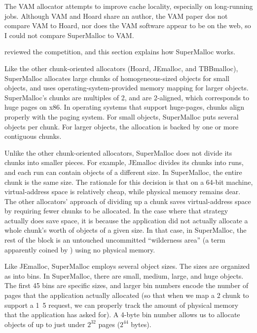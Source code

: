 \documentclass{sigplanconf}
\begin{document}
The VAM allocator \cite{FengBe05} attempts to improve cache locality,
especially on long-running jobs.  Although VAM and Hoard share an
author, the VAM paper dos not compare VAM to Hoard, nor does the VAM
software appear to be on the web, so I could not compare SuperMalloc
to VAM\@.


 reviewed the competition, and this section explains how
SuperMalloc works.   

Like the other chunk-oriented allocators (Hoard, JEmalloc, and
TBBmalloc), SuperMalloc allocates large chunks of homogeneous-sized
objects for small objects, and uses operating-system-provided memory
mapping for larger objects.  SuperMalloc's chunks are multiples of
\unit{2}\mebi\byte, and are \unit{2}\mebi\byte{}-aligned, which
corresponds to huge pages on x86.  In operating systems that support
huge-pages, chunks align properly with the paging system.  For small
objects, SuperMalloc puts several objects per chunk.  For larger
objects, the allocation is backed by one or more contiguous chunks.

Unlike the other chunk-oriented allocators, SuperMalloc does not
divide its chunks into smaller pieces.  For example, JEmalloc divides
its chunks into runs, and each run can contain objects of a different
size.  In SuperMalloc, the entire chunk is the same size.  The
rationale for this decision is that on a 64-bit machine,
virtual-address space is relatively cheap, while physical memory
remains dear.  The other allocators' approach of dividing up a chunk
saves virtual-address space by requiring fewer chunks to be allocated.
In the case where that strategy actually does save space, it is
because the application did not actually allocate a whole chunk's
worth of objects of a given size.  In that case, in SuperMalloc, the
rest of the block is an untouched uncommitted ``wilderness area'' (a
term apparently coined by \cite{KornVo85}) using no physical memory.



Like JEmalloc, SuperMalloc employs several object sizes.  The sizes
are organized as into bins.  In SuperMalloc, there are small, medium,
large, and huge objects.  The first 45 bins are specific sizes, and
larger bin numbers encode the number of pages that the application
actually allocated (so that when we map a \unit{2}\mebi\byte{} chunk
to support a \unit{1.5}\mebi\byte{} request, we can properly track
the amount of physical memory that the application has asked for).  A
4-byte bin number allows us to allocate objects of up to just under
$2^{32}$ pages ($2^{44}$ bytes).
\end{document}
